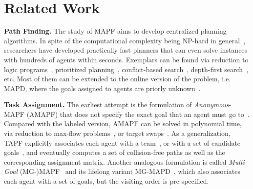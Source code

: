 \section{Related Work}
\label{sec:related}

\textbf{Path Finding.}
The study of MAPF aims to develop centralized planning algorithms.
In spite of the computational complexity being NP-hard in general~\cite{yu2013structure},
researchers have developed practically fast planners that can even solve instances with hundreds of agents within seconds.
Exemplars can be found via reduction to logic programs~\cite{erdem2013general},
prioritized planning~\cite{silver2005cooperative,ma2019searching,okumura2022priority},
conflict-based search~\cite{sharon2015conflict,li2021eecbs}, 
depth-first search~\cite{okumura2023lacam}, etc.
Most of them can be extended to the online version of the problem, i.e. MAPD,
where the goals assigned to agents are priorly unknown~\cite{ma2017lifelong,vsvancara2019online,li2021lifelong}.


\textbf{Task Assignment.}
The earliest attempt is the formulation of \textit{Anonymous}-MAPF (AMAPF) that does not specify the exact goal that an agent must go to~\cite{stern2019multi}.
Compared with the labeled version, AMAPF can be solved in polynomial time,
via reduction to max-flow problems~\cite{yu2013multi}, or target swaps~\cite{okumura2023solving}.
As a generalization,
TAPF explicitly associates each agent with a team~\cite{ma2016optimal}, or with a set of candidate goals~\cite{honig2018conflict,tang2023solving},
and eventually computes a set of collision-free paths as well as the corresponding assignment matrix.
Another analogous formulation is called \textit{Multi-Goal} (MG-)MAPF~\cite{surynek2021multi,ijcai2024p0028} and its lifelong variant MG-MAPD~\cite{xu2022multi}, which also associates each agent with a set of goals, but the visiting order is pre-specified.

